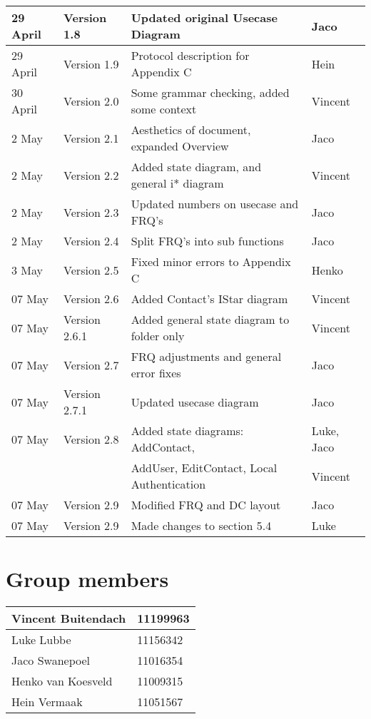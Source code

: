 \begin{center}
\begin{tabular}{|l|l|l|l|}
\hline
29 April & Version 1.8 & Updated original Usecase Diagram& Jaco\\
\hline
29 April & Version 1.9 & Protocol description for Appendix C& Hein\\
\hline
30 April & Version 2.0 & Some grammar checking, added some context & Vincent\\
\hline
2 May & Version 2.1 & Aesthetics of document, expanded Overview& Jaco\\
\hline
2 May & Version 2.2 & Added state diagram, and general i* diagram & Vincent\\
\hline
2 May & Version 2.3 & Updated numbers on usecase and FRQ's & Jaco\\
\hline
2 May & Version 2.4 & Split FRQ's into sub functions& Jaco\\
\hline
3 May & Version 2.5 & Fixed minor errors to Appendix C& Henko\\
\hline
07 May & Version 2.6 & Added Contact's IStar diagram & Vincent\\
\hline
07 May & Version 2.6.1 & Added general state diagram to folder only & Vincent\\
\hline
07 May & Version 2.7 & FRQ adjustments and general error fixes & Jaco\\
\hline
07 May & Version 2.7.1 & Updated usecase diagram& Jaco\\
\hline
07 May & Version 2.8 &Added state diagrams: AddContact, &Luke, Jaco\\
&&AddUser, EditContact, Local Authentication&Vincent\\
\hline
07 May & Version 2.9 & Modified FRQ and DC layout & Jaco\\
\hline
07 May & Version 2.9 & Made changes to section 5.4 & Luke\\
\hline
\end{tabular}

\vfill
\section{Group members}

\begin{tabular}{|l|l|}

\hline
Vincent Buitendach & 11199963\\
\hline
Luke Lubbe & 11156342\\
\hline
Jaco Swanepoel & 11016354\\
\hline
Henko van Koesveld & 11009315\\
\hline
Hein Vermaak & 11051567\\
\hline

\end{tabular}

\end{center}

